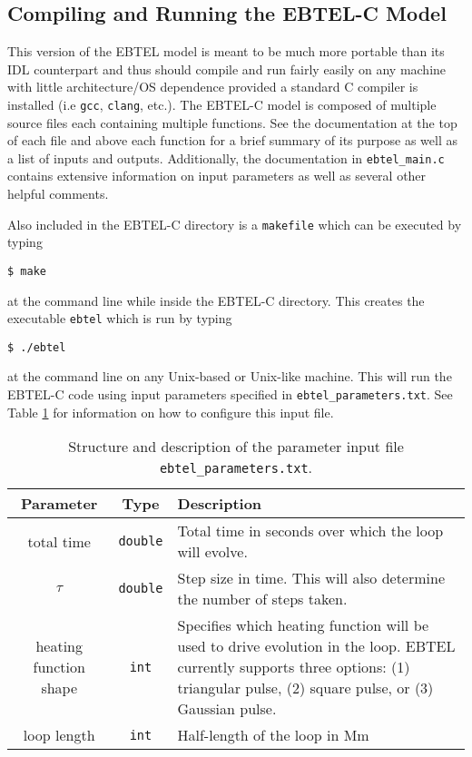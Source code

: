 \documentclass[preprint,10pt]{aastex}
\begin{document}
\begin{appendix}
\section{Compiling and Running the EBTEL-C Model}
This version of the EBTEL model is meant to be much more portable than its IDL counterpart and thus should compile and run fairly easily on any machine with little architecture/OS dependence provided a standard C compiler is installed (i.e \texttt{gcc}, \texttt{clang}, etc.). The EBTEL-C model is composed of multiple source files each containing multiple functions. See the documentation at the top of each file and above each function for a brief summary of its purpose as well as a list of inputs and outputs. Additionally, the documentation in \texttt{ebtel\_main.c} contains extensive information on input parameters as well as several other helpful comments. 
\par Also included in the EBTEL-C directory is a \texttt{makefile} which can be executed by typing
\begin{verbatim}
$ make
\end{verbatim}
at the command line while inside the EBTEL-C directory. This creates the executable \texttt{ebtel} which is run by typing 
\begin{verbatim}
$ ./ebtel
\end{verbatim}
at the command line on any Unix-based or Unix-like machine. This will run the EBTEL-C code using input parameters specified in \texttt{ebtel\_parameters.txt}. See Table \ref{table:inputs} for information on how to configure this input file. 
\begin{table}[]
\caption{Structure and description of the parameter input file \texttt{ebtel\_parameters.txt}.}
\label{table:inputs}
\begin{center}
	\begin{tabular}{c  c || p{10cm}}
	\hline
	Parameter & Type & Description \\ 
	\hline
	\hline
	 total time & \texttt{double} & Total time in seconds over which the loop will evolve. \\ \hline
	 $\tau$ & \texttt{double} & Step size in time. This will also determine the number of steps taken. \\ \hline
	 heating function shape & \texttt{int} & Specifies which heating function will be used to drive evolution in the loop. EBTEL currently supports three options:
	 							 (1) triangular pulse, (2) square pulse, or (3) Gaussian pulse.\\ \hline
	 loop length & \texttt{int} & Half-length of the loop in Mm \\ \hline

\end{tabular}
\end{center}
\end{table}
\end{appendix}
\end{document}
